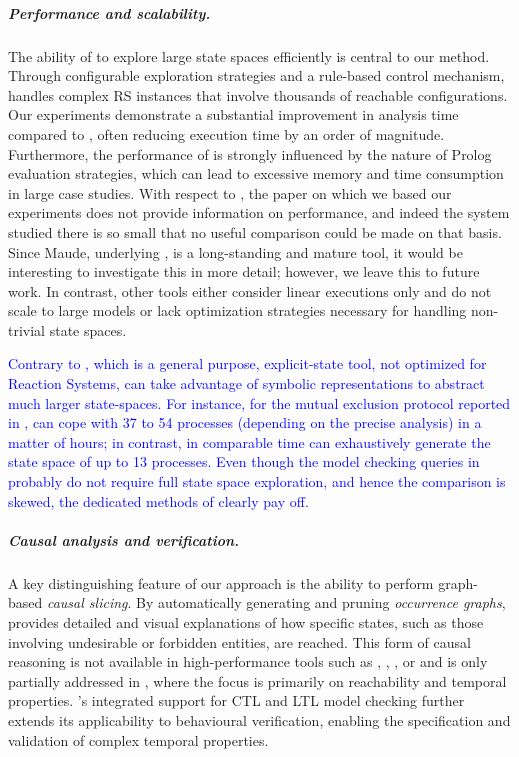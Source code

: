 \subparagraph*{Performance and scalability.}
The ability of \GROOVE to explore large state spaces efficiently is central to our method. Through configurable exploration strategies and a rule-based control mechanism, \GROOVE handles complex RS instances that involve thousands of reachable configurations. Our experiments demonstrate a substantial improvement in analysis time compared to \BioResolve, often reducing execution time by an order of magnitude. Furthermore, the performance of \BioResolve is strongly influenced by the nature of Prolog evaluation strategies, which can lead to excessive memory and time consumption in large case studies. With respect to \ccReact, the paper \cite{DBLP:conf/cmsb/BallisBFO24} on which we based our experiments does not provide information on performance, and indeed the system studied there is so small that no useful comparison could be made on that basis. Since Maude, underlying \ccReact, is a long-standing and mature tool, it would be interesting to investigate this in more detail; however, we leave this to future work.
In contrast, other tools either consider linear executions only and do not scale to large models or lack optimization strategies necessary for handling non-trivial state spaces.

\textcolor{blue}{%
Contrary to \GROOVE, which is a general purpose, explicit-state tool, not optimized for Reaction Systems, \ReactICS can take advantage of symbolic representations to abstract much larger state-spaces.
For instance, for the mutual exclusion protocol reported in \cite{DBLP:journals/isci/MeskiPR15,DBLP:journals/fuin/NobilePSMCMB17}, \ReactICS can cope with 37 to 54 processes (depending on the precise analysis) in a matter of hours; in contrast, in comparable time \GROOVE can exhaustively generate the state space of up to 13 processes. Even though the model checking queries in \ReactICS probably do not require full state space exploration, and hence the comparison is skewed, the dedicated methods of \ReactICS clearly pay off.
}

\subparagraph*{Causal analysis and verification.}
A key distinguishing feature of our approach is the ability to perform graph-based \emph{causal slicing}. By automatically generating and pruning \emph{occurrence graphs}, \GROOVE provides detailed and visual explanations of how specific states, such as those involving undesirable or forbidden entities, are reached.
This form of causal reasoning is not available in high-performance tools such as \HERESY, \WebRSim, \clrs, or 
\textcolor{blue}{
\ReactICS 
}
and is only partially addressed in \ccReact, where the focus is primarily on reachability and temporal properties. 
\GROOVE's integrated support for CTL and LTL model checking further extends its applicability to behavioural verification, enabling the specification and validation of complex temporal properties. 

